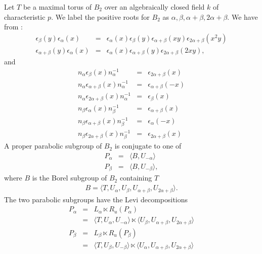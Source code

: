 Let $T$ be a maximal torus of $B_2$ over an algebraically closed field $k$ of characteristic $p$. We label the positive roots for $B_2$ as $\alpha, \beta, \alpha + \beta, 2\alpha + \beta$. We have from \cite[\S 33.4]{humphreys1975linear}:
\begin{eqnarray*}
\epsilon_\beta (y) \epsilon_\alpha (x) &=& \epsilon_\alpha (x) \epsilon_\beta (y) \epsilon_{\alpha + \beta} (xy) \epsilon_{2\alpha+\beta} (x^2y) \\
\epsilon_{\alpha + \beta} (y) \epsilon_\alpha (x) &=& \epsilon_\alpha (x) \epsilon_{\alpha + \beta} (y) \epsilon_{2\alpha + \beta} (2xy),
\end{eqnarray*}
and 
\begin{eqnarray*}
n_\alpha \epsilon_\beta(x) n_\alpha^{-1} &=& \epsilon_{2\alpha+\beta}(x)\\
n_\alpha \epsilon_{\alpha+\beta}(x) n_\alpha^{-1} &=& \epsilon_{\alpha+\beta}(-x)\\
n_\alpha \epsilon_{2\alpha+\beta}(x) n_\alpha^{-1} &=& \epsilon_{\beta}(x)\\
n_\beta \epsilon_\alpha(x) n_\beta^{-1} &=& \epsilon_{\alpha+\beta}(x)\\
n_\beta \epsilon_{\alpha+\beta}(x) n_\beta^{-1} &=& \epsilon_{\alpha}(-x)\\
n_\beta \epsilon_{2\alpha+\beta}(x) n_\beta^{-1} &=& \epsilon_{2\alpha+\beta}(x)
\end{eqnarray*}
A proper parabolic subgroup of $B_2$ is conjugate to one of
\begin{eqnarray*}
P_\alpha &=& \langle B, U_{-\alpha} \rangle\\
P_\beta &=& \langle B, U_{-\beta} \rangle,
\end{eqnarray*}
where $B$ is the Borel subgroup of $B_2$ containing $T$
\begin{eqnarray*}
B=\langle T, U_\alpha, U_\beta, U_{\alpha + \beta}, U_{2\alpha+\beta}\rangle.
\end{eqnarray*}
The two parabolic subgroups have the Levi decompositions
\begin{eqnarray*}
P_\alpha &=& L_\alpha \ltimes R_u(P_\alpha) \\
&=& \langle T, U_\alpha, U_{-\alpha} \rangle \ltimes \langle U_\beta, U_{\alpha + \beta}, U_{2\alpha + \beta} \rangle \\
P_\beta &=& L_\beta \ltimes R_u(P_\beta) \\
&=& \langle T, U_\beta, U_{-\beta} \rangle \ltimes \langle U_\alpha, U_{\alpha+\beta}, U_{2\alpha + \beta} \rangle
\end{eqnarray*}

